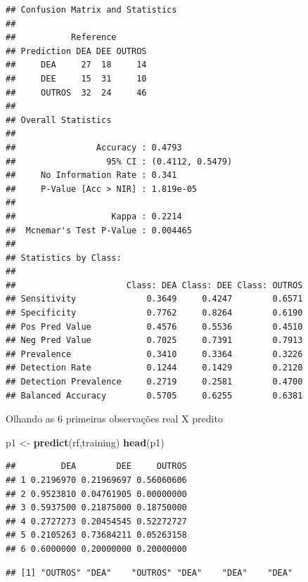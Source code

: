 \documentclass[]{article}
\newenvironment{Shaded}{\begin{snugshade}}{\end{snugshade}}
\newcommand{\KeywordTok}[1]{\textcolor[rgb]{0.13,0.29,0.53}{\textbf{#1}}}
\newcommand{\StringTok}[1]{\textcolor[rgb]{0.31,0.60,0.02}{#1}}
\newcommand{\OperatorTok}[1]{\textcolor[rgb]{0.81,0.36,0.00}{\textbf{#1}}}
\newcommand{\NormalTok}[1]{#1}
\begin{document}
\begin{verbatim}
## Confusion Matrix and Statistics
## 
##           Reference
## Prediction DEA DEE OUTROS
##     DEA     27  18     14
##     DEE     15  31     10
##     OUTROS  32  24     46
## 
## Overall Statistics
##                                           
##                Accuracy : 0.4793          
##                  95% CI : (0.4112, 0.5479)
##     No Information Rate : 0.341           
##     P-Value [Acc > NIR] : 1.819e-05       
##                                           
##                   Kappa : 0.2214          
##  Mcnemar's Test P-Value : 0.004465        
## 
## Statistics by Class:
## 
##                      Class: DEA Class: DEE Class: OUTROS
## Sensitivity              0.3649     0.4247        0.6571
## Specificity              0.7762     0.8264        0.6190
## Pos Pred Value           0.4576     0.5536        0.4510
## Neg Pred Value           0.7025     0.7391        0.7913
## Prevalence               0.3410     0.3364        0.3226
## Detection Rate           0.1244     0.1429        0.2120
## Detection Prevalence     0.2719     0.2581        0.4700
## Balanced Accuracy        0.5705     0.6255        0.6381
\end{verbatim}

Olhando as 6 primeiras observações real X predito

\begin{Shaded}
\begin{Highlighting}[]
\NormalTok{p1 <-}\StringTok{ }\KeywordTok{predict}\NormalTok{(rf,training)}
\KeywordTok{head}\NormalTok{(p1)}
\end{Highlighting}
\end{Shaded}

\begin{verbatim}
##         DEA        DEE     OUTROS
## 1 0.2196970 0.21969697 0.56060606
## 2 0.9523810 0.04761905 0.00000000
## 3 0.5937500 0.21875000 0.18750000
## 4 0.2727273 0.20454545 0.52272727
## 5 0.2105263 0.73684211 0.05263158
## 6 0.6000000 0.20000000 0.20000000
\end{verbatim}

\begin{Shaded}
\end{Shaded}

\begin{verbatim}
## [1] "OUTROS" "DEA"    "OUTROS" "DEA"    "DEA"    "DEA"
\end{verbatim}
\end{document}
